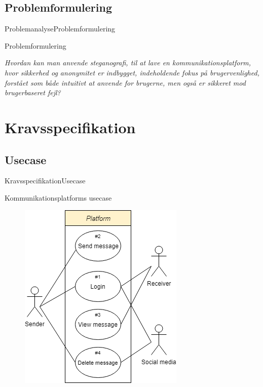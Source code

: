 \documentclass[10pt]{beamer}
\begin{document}
        \subsection{Problemformulering}
        \begin{frame}{Problemanalyse}{Problemformulering}
            \begin{block}{Problemformulering}
                \begin{mdframed}[linewidth=0pt,backgroundcolor=lightgray!20,innertopmargin = 0.2cm,innerbottommargin = 0.2cm]
                    \footnotesize
                    \textit{Hvordan kan man anvende steganografi, til at lave en kommunikationsplatform, hvor sikkerhed
og anonymitet er indbygget, indeholdende fokus på brugervenlighed, forstået som både intuitivt at
anvende for brugerne, men også er sikkeret mod brugerbaseret fejl?}
                \end{mdframed}
            \end{block}
        \end{frame}
        
    \section{Kravsspecifikation}
        
        \subsection{Usecase}
        \begin{frame}{Kravsspecifikation}{Usecase}
            \begin{block}{Kommunikationsplatforms usecase}
                \begin{figure}[H]
                    \centering
                    \includegraphics[width=0.50\linewidth]{Projectdoc/Assets/Illustrationer/simple-usecase.png}
                \end{figure}
            \end{block}
        \end{frame}
        
\end{document}
